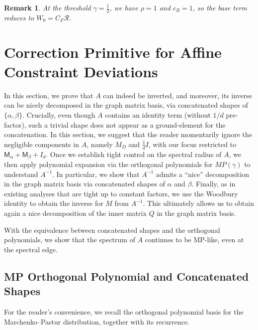 \documentclass[12pt]{article}
\def \al {\alpha}
\newtheorem{remark}[theorem]{Remark}
\newcommand{\calR}{\mathcal{R}}
\newcommand{\cm}{\mathsf{M} }
\newcommand{\Authornote}[3]{{\sf\footnotesize\color{#3}{[#1: #2]}}}
\newcommand{\Authornote}[3]{}
\newcommand{\jnote}[1]{\Authornote{Jeff}{#1}{blue}}
\newcommand{\snote}[1]{\Authornote{Sofia}{#1}{orange}}
\begin{document}
\begin{remark}
At the threshold \(\gamma=\frac12\), we have \(\rho=1\) and \(c_R=1\),
so the base term reduces to
\(
W_0=C_F \calR. 
\)	
\jnote{check the sign?}
\end{remark}


\section{Correction Primitive for Affine Constraint Deviations}
\label{sec:MP-sec}

In this section,  we prove that $A$ can indeed be inverted, and moreover, its inverse can be nicely decomposed in the graph matrix basis, via concatenated shapes of $\{\al, \beta \}$. Crucially, even though $A$ contains an identity term (without $1/d$ pre-factor), such a trivial shape does not appear as a ground-element for the concatenation.
\mpPolynomialShapeConcatenation*
In this section, we suggest that the reader momentarily ignore the negligible components in $A$, namely $M_D$ and $\frac{1}{d} I$, with our focus restricted to $\cm_\al + \cm_\beta + I_d $.
Once we establish tight control on the spectral radius of $A$, we then apply polynomial expansion via the orthogonal polynomials for $MP(\gamma)$ to understand $A^{-1}$. In particular, we show that $A^{-1}$ admits a ``nice'' decomposition in the graph matrix basis via concatenated shapes of $\al$ and $\beta$. Finally, as in existing analyses that are tight up to constant factors, we use the Woodbury identity to obtain the inverse for $M$ from $A^{-1}$.  This ultimately allows us to obtain again a nice decomposition of the inner matrix $Q$ in the graph matrix basis.

With the equivalence between concatenated shapes and the orthogonal polynomials, we show that the spectrum of $A$ continues to be MP-like, even at the spectral edge.
\spectralradiusA*
%
%
\subsection{MP Orthogonal Polynomial and Concatenated Shapes} For the reader's convenience, we recall the orthogonal polynomial basis
for the Marchenko--Pastur distribution, together with its recurrence.
\end{document}
